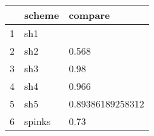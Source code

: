 \begin{table}[ht]
\centering
\begin{tabular}{rll}
  \hline
 & scheme & compare \\ 
  \hline
1 & sh1 &  \\ 
  2 & sh2 & 0.568 \\ 
  3 & sh3 & 0.98 \\ 
  4 & sh4 & 0.966 \\ 
  5 & sh5 & 0.89386189258312 \\ 
  6 & spinks & 0.73 \\ 
   \hline
\end{tabular}
\label{mmdif}
\end{table}
